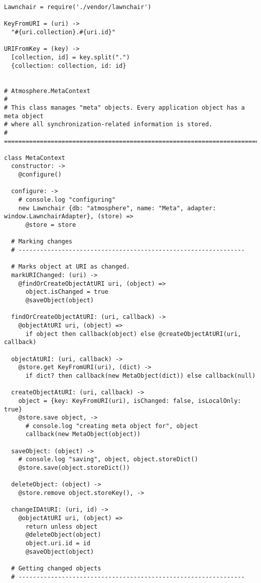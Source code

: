 \begin{lstlisting}[caption=meta_context.coffee]
Lawnchair = require('./vendor/lawnchair')

KeyFromURI = (uri) ->
  "#{uri.collection}.#{uri.id}"

URIFromKey = (key) ->
  [collection, id] = key.split(".")
  {collection: collection, id: id}
  

# Atmosphere.MetaContext
#
# This class manages "meta" objects. Every application object has a meta object
# where all synchronization-related information is stored.
# =============================================================================

class MetaContext
  constructor: ->
    @configure()
    
  configure: ->
    # console.log "configuring"
    new Lawnchair {db: "atmosphere", name: "Meta", adapter: window.LawnchairAdapter}, (store) =>
      @store = store
  
  # Marking changes
  # ---------------------------------------------------------------
  
  # Marks object at URI as changed.
  markURIChanged: (uri) ->
    @findOrCreateObjectAtURI uri, (object) =>
      object.isChanged = true
      @saveObject(object)

  findOrCreateObjectAtURI: (uri, callback) ->
    @objectAtURI uri, (object) =>
      if object then callback(object) else @createObjectAtURI(uri, callback)
        
  objectAtURI: (uri, callback) ->
    @store.get KeyFromURI(uri), (dict) ->
      if dict? then callback(new MetaObject(dict)) else callback(null)
  
  createObjectAtURI: (uri, callback) ->
    object = {key: KeyFromURI(uri), isChanged: false, isLocalOnly: true}
    @store.save object, ->
      # console.log "creating meta object for", object
      callback(new MetaObject(object))
  
  saveObject: (object) ->
    # console.log "saving", object, object.storeDict()
    @store.save(object.storeDict())
  
  deleteObject: (object) ->
    @store.remove object.storeKey(), ->
  
  changeIDAtURI: (uri, id) ->
    @objectAtURI uri, (object) =>
      return unless object
      @deleteObject(object)
      object.uri.id = id
      @saveObject(object)
  
  # Getting changed objects
  # ---------------------------------------------------------------
  

\end{lstlisting}
